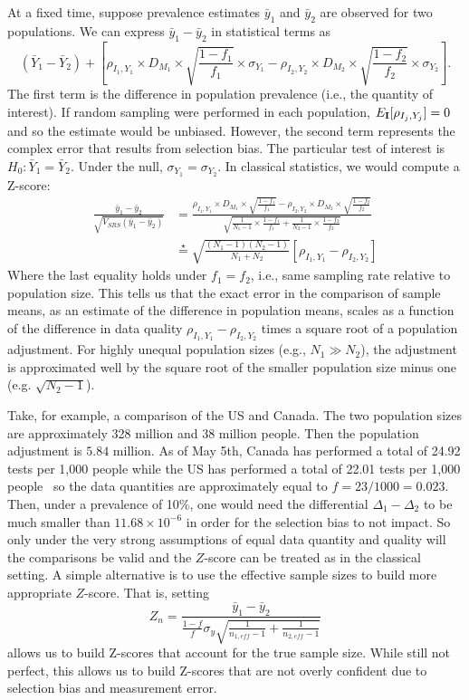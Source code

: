 \documentclass[12pt]{article}
\def\I{{\bf I}}
\begin{document}
At a fixed time, suppose prevalence estimates $\bar y_1$ and $\bar y_2$ are observed for two populations. We can express $\bar y_1 - \bar y_2$ in statistical terms as
$$
(\bar Y_1 - \bar Y_2) + \left[ \rho_{I_1, Y_1} \times D_{M_1} \times \sqrt{\frac{1-f_1}{f_1}} \times \sigma_{Y_1}  - \rho_{I_2, Y_2} \times D_{M_2} \times \sqrt{\frac{1-f_2}{f_2}} \times \sigma_{Y_2} \right].
$$
The first term is the difference in population prevalence (i.e., the quantity of interest).  If random sampling were performed in each population, $E_{\I} [ \rho_{I_j, Y_j}] = 0$ and so the estimate would be unbiased.  However, the second term represents the complex error that results from selection bias.
The particular test of interest is $H_0: \bar Y_1 = \bar Y_2$.  Under the null, $\sigma_{Y_1} = \sigma_{Y_2}$.  In classical statistics, we would compute a Z-score:
$$
\begin{aligned}
\frac{\bar y_1 - \bar y_2}{ \sqrt{V_{SRS} (\bar y_1 - \bar y_2)} } &=
\frac{\rho_{I_1, Y_1} \times D_{M_1} \times \sqrt{\frac{1-f_1}{f_1}}  - \rho_{I_2, Y_2} \times D_{M_2} \times \sqrt{\frac{1-f_2}{f_2}} }{ \sqrt{\frac{1}{N_1 -1} \times \frac{1-f_1}{f_1} + \frac{1}{N_2 - 1} \times \frac{1-f_2}{f_2}} }  \\
&\overset{\star}{=}
\sqrt{\frac{(N_1-1)(N_2 -1)}{N_1 + N_2}} \left[ \rho_{I_1, Y_1} - \rho_{I_2, Y_2} \right]
\end{aligned}
$$
Where the last equality holds under $f_1 = f_2$, i.e., same sampling rate relative to population size. This tells us that the exact error in the comparison of sample means, as an estimate of the difference in population means, scales as a function of the difference in data quality $\rho_{I_1, Y_1} - \rho_{I_2, Y_2}$ times a square root of a population adjustment.  For highly unequal population sizes (e.g., $N_1 \gg N_2$), the adjustment is approximated well by the square root of the smaller population size minus one (e.g. $\sqrt{N_2 -1}$).

Take, for example, a comparison of the US and Canada.  The two population sizes are approximately 328 million and 38 million people.  Then the population adjustment is $5.84$ million. As of May 5th, Canada has performed a total of 24.92 tests per 1,000 people while the US has performed a total of 22.01 tests per 1,000 people~\cite{worlddata} so the data quantities are approximately equal to $f = 23/1000 = 0.023$.  Then, under a prevalence of 10\%, one would need the differential $\Delta_1-\Delta_2$ to be much smaller than $11.68 \times 10^{-6}$ in order for the selection bias to not impact.  So only under the very strong assumptions of equal data quantity and quality will the comparisons be valid and the $Z$-score can be treated as in the classical setting.  A simple alternative is to use the effective sample sizes to build more appropriate $Z$-score.  That is, setting
$$
Z_n = \frac{\bar y_1 - \bar y_2}{ \frac{1-f}{f} \sigma_y \sqrt{ \frac{1}{n_{1,eff} - 1} + \frac{1}{n_{2,eff} - 1}}}
$$
allows us to build Z-scores that account for the true sample size.  While still not perfect, this allows us to build Z-scores that are not overly confident due to selection bias and measurement error.
\end{document}
